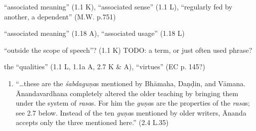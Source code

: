 \documentclass[10pt]{article}
\begin{document}
\begin{multicols}{2}
\begin{enumerate}[
			leftmargin=0em,
			rightmargin=0em,
		]
		 ``associated meaning'' (1.1 K), ``associated sense'' (1.1 L), ``regularly fed by another, a dependent'' (M.W. p.751)
		\begin{itemize}
			 ``associated meaning'' (1.18 A), ``associated usage'' (1.18 L)
		\end{itemize}



		 ``outside the scope of speech''? (1.1 K) TODO: a term, or just often used phrase?



		 the ``qualities'' (1.1 L, 1.1a A, 2.7 K \& A), ``virtues'' (EC p. 145?)
		\begin{enumerate}
			 ``sweetness'' (2.7 K.1),
			``Sweetness has its seat in poetry that is full of this flavor [\textit{śṛṅgāra}].''

			 ``force'' (2.7 K.1),
			``strength'' (2.9 K)

			 ``clarity'' (2.7 K.1),
			``perspicuity'' [K. Kris.\ 2.10 K?, p.???],
			NB: ``[clarity] is a quality common to all \textit{rasa}s''

			\item ``\dots these are the \textit{śabdaguṇa}s mentioned by Bhāmaha, Daṇḍin, and Vāmana. Ānanda\-var\-dhana completely altered the older teaching by bringing them under the system of \textit{rasa}s. For him the \textit{guṇa}s are the properties of the \textit{rasa}s; see 2.7 below. Instead of the ten \textit{guṇa}s mentioned by older writers, Ānanda accepts only the three mentioned here.'' (2.4 L.35)
		\end{enumerate}



\end{enumerate}
\end{multicols}
\end{document}
